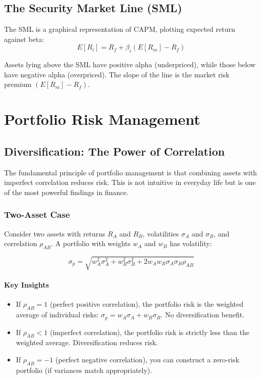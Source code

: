 \subsection{The Security Market Line (SML)}

The SML is a graphical representation of CAPM, plotting expected return against beta:
\begin{equation}
    E[R_i] = R_f + \beta_i (E[R_m] - R_f)
\end{equation}

Assets lying above the SML have positive alpha (underpriced), while those below have negative alpha (overpriced). The slope of the line is the market risk premium $(E[R_m] - R_f)$.

\section{Portfolio Risk Management}

\subsection{Diversification: The Power of Correlation}

The fundamental principle of portfolio management is that combining assets with imperfect correlation reduces risk. This is not intuitive in everyday life but is one of the most powerful findings in finance.

\subsubsection{Two-Asset Case}

Consider two assets with returns $R_A$ and $R_B$, volatilities $\sigma_A$ and $\sigma_B$, and correlation $\rho_{AB}$. A portfolio with weights $w_A$ and $w_B$ has volatility:

\begin{equation}
    \sigma_p = \sqrt{w_A^2 \sigma_A^2 + w_B^2 \sigma_B^2 + 2 w_A w_B \sigma_A \sigma_B \rho_{AB}}
\end{equation}

\paragraph{Key Insights}
\begin{itemize}
    \item If $\rho_{AB} = 1$ (perfect positive correlation), the portfolio risk is the weighted average of individual risks: $\sigma_p = w_A \sigma_A + w_B \sigma_B$. No diversification benefit.
    
    \item If $\rho_{AB} < 1$ (imperfect correlation), the portfolio risk is strictly less than the weighted average. Diversification reduces risk.
    
    \item If $\rho_{AB} = -1$ (perfect negative correlation), you can construct a zero-risk portfolio (if variances match appropriately).
\end{itemize}

